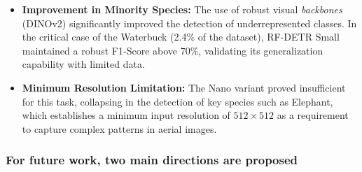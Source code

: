 \begin{itemize}
    \item \textbf{Improvement in Minority Species:} The use of robust visual \textit{backbones} (DINOv2) significantly improved the detection of underrepresented classes. In the critical case of the Waterbuck (2.4\% of the dataset), RF-DETR Small maintained a robust F1-Score above 70\%, validating its generalization capability with limited data.

    \item \textbf{Minimum Resolution Limitation:} The Nano variant proved insufficient for this task, collapsing in the detection of key species such as Elephant, which establishes a minimum input resolution of $512 \times 512$ as a requirement to capture complex patterns in aerial images.\newline
\end{itemize}

\subsubsection*{For future work, two main directions are proposed}

